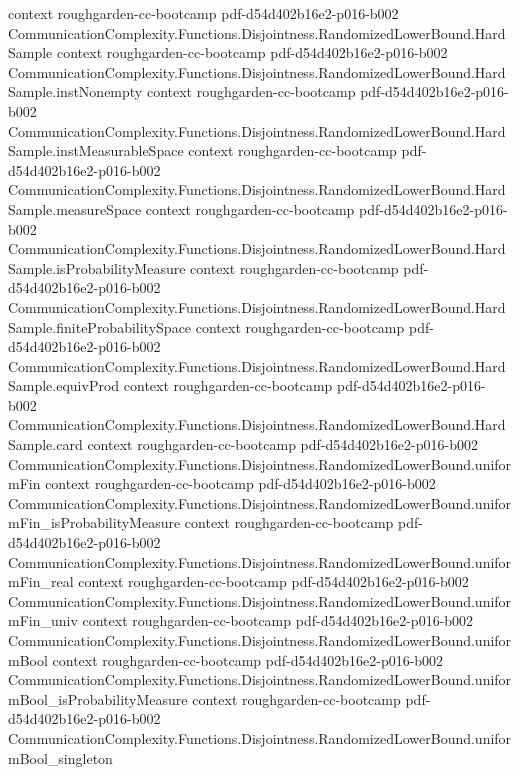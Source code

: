 \begin{theorem}
  {context}
  {roughgarden-cc-bootcamp}
  {pdf-d54d402b16e2-p016-b002}
\proofstep
  {CommunicationComplexity.Functions.Disjointness.RandomizedLowerBound.HardSample}
  {context}
  {roughgarden-cc-bootcamp}
  {pdf-d54d402b16e2-p016-b002}
\proofstep
  {CommunicationComplexity.Functions.Disjointness.RandomizedLowerBound.HardSample.instNonempty}
  {context}
  {roughgarden-cc-bootcamp}
  {pdf-d54d402b16e2-p016-b002}
\proofstep
  {CommunicationComplexity.Functions.Disjointness.RandomizedLowerBound.HardSample.instMeasurableSpace}
  {context}
  {roughgarden-cc-bootcamp}
  {pdf-d54d402b16e2-p016-b002}
\proofstep
  {CommunicationComplexity.Functions.Disjointness.RandomizedLowerBound.HardSample.measureSpace}
  {context}
  {roughgarden-cc-bootcamp}
  {pdf-d54d402b16e2-p016-b002}
\proofstep
  {CommunicationComplexity.Functions.Disjointness.RandomizedLowerBound.HardSample.isProbabilityMeasure}
  {context}
  {roughgarden-cc-bootcamp}
  {pdf-d54d402b16e2-p016-b002}
\proofstep
  {CommunicationComplexity.Functions.Disjointness.RandomizedLowerBound.HardSample.finiteProbabilitySpace}
  {context}
  {roughgarden-cc-bootcamp}
  {pdf-d54d402b16e2-p016-b002}
\proofstep
  {CommunicationComplexity.Functions.Disjointness.RandomizedLowerBound.HardSample.equivProd}
  {context}
  {roughgarden-cc-bootcamp}
  {pdf-d54d402b16e2-p016-b002}
\proofstep
  {CommunicationComplexity.Functions.Disjointness.RandomizedLowerBound.HardSample.card}
  {context}
  {roughgarden-cc-bootcamp}
  {pdf-d54d402b16e2-p016-b002}
\proofstep
  {CommunicationComplexity.Functions.Disjointness.RandomizedLowerBound.uniformFin}
  {context}
  {roughgarden-cc-bootcamp}
  {pdf-d54d402b16e2-p016-b002}
\proofstep
  {CommunicationComplexity.Functions.Disjointness.RandomizedLowerBound.uniformFin_isProbabilityMeasure}
  {context}
  {roughgarden-cc-bootcamp}
  {pdf-d54d402b16e2-p016-b002}
\proofstep
  {CommunicationComplexity.Functions.Disjointness.RandomizedLowerBound.uniformFin_real}
  {context}
  {roughgarden-cc-bootcamp}
  {pdf-d54d402b16e2-p016-b002}
\proofstep
  {CommunicationComplexity.Functions.Disjointness.RandomizedLowerBound.uniformFin_univ}
  {context}
  {roughgarden-cc-bootcamp}
  {pdf-d54d402b16e2-p016-b002}
\proofstep
  {CommunicationComplexity.Functions.Disjointness.RandomizedLowerBound.uniformBool}
  {context}
  {roughgarden-cc-bootcamp}
  {pdf-d54d402b16e2-p016-b002}
\proofstep
  {CommunicationComplexity.Functions.Disjointness.RandomizedLowerBound.uniformBool_isProbabilityMeasure}
  {context}
  {roughgarden-cc-bootcamp}
  {pdf-d54d402b16e2-p016-b002}
\proofstep
  {CommunicationComplexity.Functions.Disjointness.RandomizedLowerBound.uniformBool_singleton}

\end{theorem}
